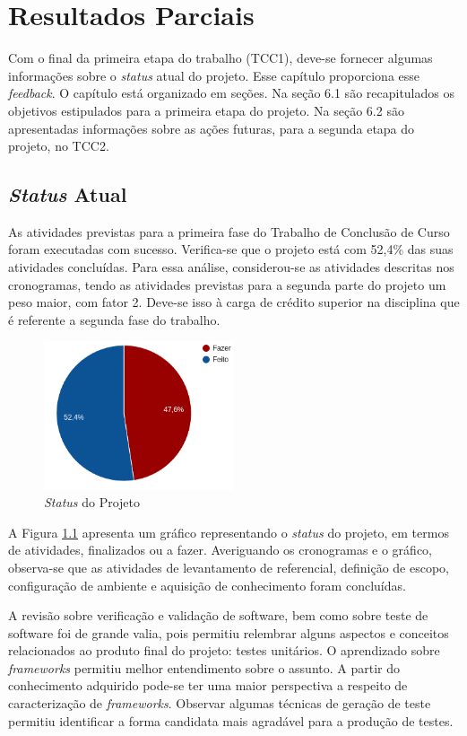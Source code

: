 \chapter[Resultados Parciais]{Resultados Parciais}
Com o final da primeira etapa do trabalho (TCC1), deve-se fornecer algumas informações sobre o \textit{status} atual do projeto. Esse capítulo proporciona esse \textit{feedback}. O capítulo está organizado em seções. Na seção 6.1 são recapitulados os objetivos estipulados para a primeira etapa do projeto. Na seção 6.2 são apresentadas informações sobre as ações futuras, para a segunda etapa do projeto, no TCC2.

\section{\textit{Status} Atual}
As atividades previstas para a primeira fase do Trabalho de Conclusão de Curso foram executadas com sucesso. Verifica-se que o projeto está com 52,4\%  das suas atividades concluídas. Para essa análise, considerou-se as atividades descritas nos cronogramas, tendo as atividades previstas para a segunda parte do projeto um peso maior, com fator 2. Deve-se isso à carga de crédito superior na disciplina que é referente a segunda fase do trabalho.
\par
\begin{figure}[h]
\centering
  \includegraphics[width=0.5\textwidth]{figuras/pizzadobro.png}
  \caption{ \textit{Status} do Projeto}
  \label{fig:resultados}
\end{figure}
\par
\indent A Figura \ref{fig:resultados} apresenta um gráfico representando o \textit{status} do projeto, em termos de atividades, finalizados ou a fazer. Averiguando os cronogramas e o gráfico, observa-se que as atividades de levantamento de referencial, definição de escopo, configuração de ambiente e aquisição de conhecimento foram concluídas.
\par
\indent A revisão sobre verificação e validação de software, bem como sobre teste de software foi de grande valia, pois permitiu relembrar alguns aspectos e conceitos relacionados ao produto final do projeto: testes unitários. O aprendizado sobre \textit{frameworks} permitiu melhor entendimento sobre o assunto. A partir do conhecimento adquirido pode-se ter uma maior perspectiva a respeito de caracterização de \textit{frameworks}. Observar algumas técnicas de geração de teste permitiu identificar a forma candidata mais agradável para a produção de testes.
